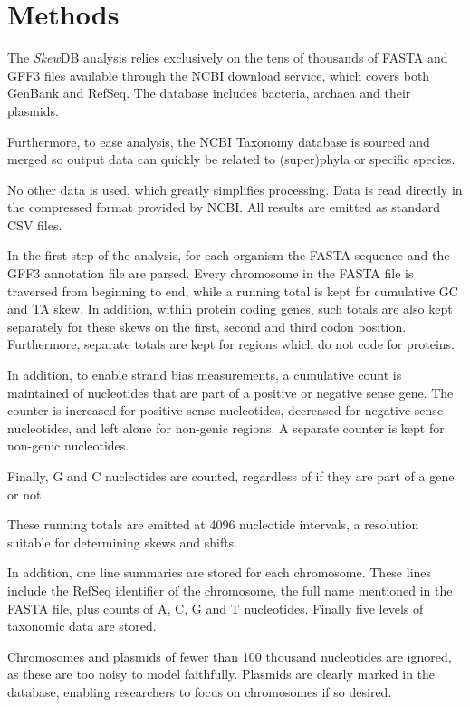 \documentclass[fleqn,10pt]{wlscirep}
\begin{document}
\section*{Methods}
The \emph{Skew}DB analysis relies exclusively on the tens of thousands of FASTA and GFF3 files available through the NCBI download service, which covers both GenBank and RefSeq. The database includes bacteria, archaea and their plasmids.

Furthermore, to ease analysis, the NCBI Taxonomy database is sourced and merged so output data can quickly be related to (super)phyla or specific species.

No other data is used, which greatly simplifies processing. Data is read directly in the compressed format provided by NCBI. All results are emitted as standard CSV files.

In the first step of the analysis, for each organism the FASTA sequence and the GFF3 annotation file are parsed. Every chromosome in the FASTA file is traversed from beginning to end, while a running total is kept for cumulative GC and TA skew. In addition, within protein coding genes, such totals are also kept separately for these skews on the first, second and third codon position. Furthermore, separate totals are kept for regions which do not code for proteins.

In addition, to enable strand bias measurements, a cumulative count is maintained of nucleotides that are part of a positive or negative sense gene. The counter is increased for positive sense nucleotides, decreased for negative sense nucleotides, and left alone for non-genic regions. A separate counter is kept for non-genic nucleotides. 

Finally, G and C nucleotides are counted, regardless of if they are part of a gene or not.

These running totals are emitted at 4096 nucleotide intervals, a resolution suitable for determining skews and shifts.

In addition, one line summaries are stored for each chromosome. These lines include the RefSeq identifier of the chromosome, the full name mentioned in the FASTA file, plus counts of A, C, G and T nucleotides. Finally five levels of taxonomic data are stored.

Chromosomes and plasmids of fewer than 100 thousand nucleotides are ignored, as these are too noisy to model faithfully. Plasmids are clearly marked in the database, enabling researchers to focus on chromosomes if so desired.
\end{document}
